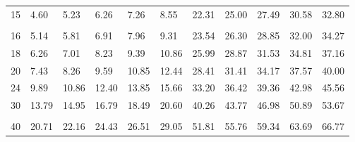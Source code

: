 \begin{table}[H]
{\begin{tabular}{ c | l l l l l l l l l l}
            15                   & 4.60                   & 5.23               & 6.26                   & 7.26                 & 8.55                  & 22.31                 & 25.00                 & 27.49                   & 30.58                 & 32.80                   \\
                                 &                        &                    &                        &                      &                       &                       &                       &                         &                       &                         \\
            16                   & 5.14                   & 5.81               & 6.91                   & 7.96                 & 9.31                  & 23.54                 & 26.30                 & 28.85                   & 32.00                 & 34.27                   \\
            18                   & 6.26                   & 7.01               & 8.23                   & 9.39                 & 10.86                 & 25.99                 & 28.87                 & 31.53                   & 34.81                 & 37.16                   \\
            20                   & 7.43                   & 8.26               & 9.59                   & 10.85                & 12.44                 & 28.41                 & 31.41                 & 34.17                   & 37.57                 & 40.00                   \\
            24                   & 9.89                   & 10.86              & 12.40                  & 13.85                & 15.66                 & 33.20                 & 36.42                 & 39.36                   & 42.98                 & 45.56                   \\
            30                   & 13.79                  & 14.95              & 16.79                  & 18.49                & 20.60                 & 40.26                 & 43.77                 & 46.98                   & 50.89                 & 53.67                   \\
                                 &                        &                    &                        &                      &                       &                       &                       &                         &                       &                         \\
            40                   & 20.71                  & 22.16              & 24.43                  & 26.51                & 29.05                 & 51.81                 & 55.76                 & 59.34                   & 63.69                 & 66.77                   \\

\end{tabular}}
\end{table}
